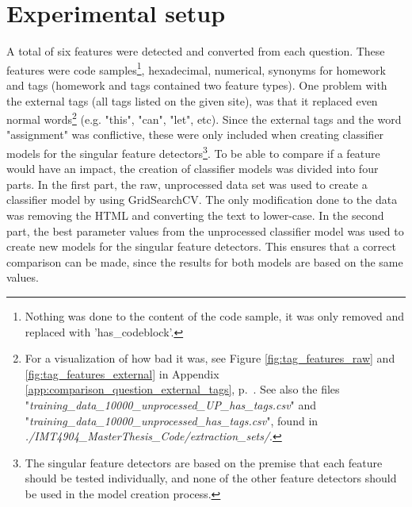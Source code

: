 \label{chap:chapter4}

\section{Experimental setup}
\label{sec:experimental_setup}
A total of six features were detected and converted from each question. 
These features were code samples\footnote{
	Nothing was done to the content of the code sample, it was only removed and replaced with 'has\_codeblock'.
}, 
hexadecimal, numerical, synonyms for homework and tags (homework and tags contained two feature types). 
One problem with the external tags (all tags listed on the given site), was that it replaced even normal words\footnote{
	For a visualization of how bad it was, see Figure \ref{fig:tag_features_raw} and \ref{fig:tag_features_external} in Appendix \ref{app:comparison_question_external_tags}, 
	p.~\pageref{app:comparison_question_external_tags}.
	See also the files "\emph{training\_data\_10000\_unprocessed\_UP\_has\_tags.csv}" and \\ "\emph{training\_data\_10000\_unprocessed\_has\_tags.csv}", found in  
	\emph{./IMT4904\_MasterThesis\_Code/extraction\_sets/}.
} (e.g. "this", "can", "let", etc).
Since the external tags and the word "assignment" was conflictive, these were only included when creating classifier models for the singular feature detectors\footnote{
	The singular feature detectors are based on the premise that each feature should be tested individually, and none of the other feature detectors should be used in the model creation process.
}.
\vspace{0.5em}\newline
To be able to compare if a feature would have an impact, the creation of classifier models was divided into four parts. 
In the first part, the raw, unprocessed data set was used to create a classifier model by using GridSearchCV. 
The only modification done to the data was removing the HTML and converting the text to lower-case. 
\vspace{0.5em}\newline
In the second part, the best parameter values from the unprocessed classifier model was used to create new models for the singular feature detectors.
This ensures that a correct comparison can be made, since the results for both models are based on the same values. 
